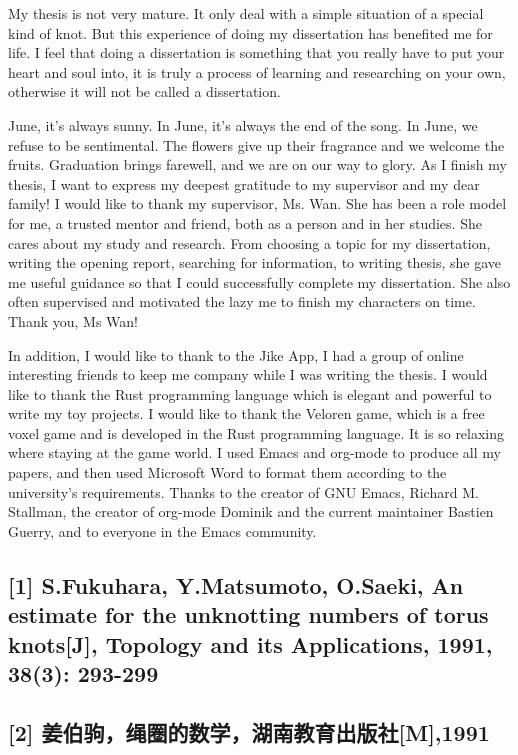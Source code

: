 \documentclass[lang=cn]{elegantpaper}
\begin{document}
My thesis is not very mature. It only deal with a simple situation of a special kind of knot. But this experience of doing my dissertation has benefited me for life. I feel that doing a dissertation is something that you really have to put your heart and soul into, it is truly a process of learning and researching on your own, otherwise it will not be called a dissertation.

June, it's always sunny. In June, it's always the end of the song. In June, we refuse to be sentimental. The flowers give up their fragrance and we welcome the fruits. Graduation brings farewell, and we are on our way to glory. As I finish my thesis, I want to express my deepest gratitude to my supervisor and my dear family! I would like to thank my supervisor, Ms. Wan. She has been a role model for me, a trusted mentor and friend, both as a person and in her studies. She cares about my study and research. From choosing a topic for my dissertation, writing the opening report, searching for information, to writing thesis, she gave me  useful guidance so that I could successfully complete my dissertation. She also often supervised and motivated the lazy me to finish my characters on time. Thank you, Ms Wan!

In addition, I would like to thank to the Jike App, I had a group of online interesting friends to keep me company while I was writing the thesis. I would like to thank the Rust programming language which is elegant and powerful to write my toy projects. I would like to thank the Veloren game, which is a free voxel game and is developed in the Rust programming language. It is so relaxing where staying at the game world. I used Emacs and org-mode to produce all my papers, and then used Microsoft Word to format them according to the university's requirements. Thanks to the creator of GNU Emacs, Richard M. Stallman, the creator of org-mode Dominik and the current maintainer Bastien Guerry, and to everyone in the Emacs community.

\subsection{[1] S.Fukuhara, Y.Matsumoto, O.Saeki, An estimate for the unknotting numbers of torus knots[J], Topology and its Applications, 1991, 38(3): 293-299}
\label{sec:org2681f4a}
\subsection{[2] 姜伯驹，绳圈的数学，湖南教育出版社[M],1991}
\label{sec:orga81bc1c}
\end{document}

